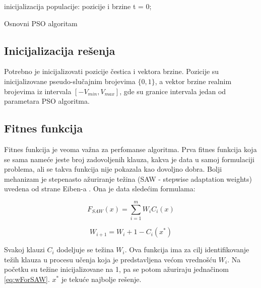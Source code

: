 \documentclass{article}
\begin{document}
\begin{algorithm}[H]
\SetAlgoLined
{}

\BlankLine
 inicijalizacija populacije: pozicije i brzine\;
 t = 0; \\
\caption{Osnovni PSO algoritam}
\end{algorithm}


\subsection{Inicijalizacija rešenja}
\label{sec:pso_init}
Potrebno je inicijalizovati pozicije čestica i vektora brzine. Pozicije su inicijalizovane pseudo-slučajnim brojevima $\{0,1\}$, a vektor brzine realnim brojevima iz intervala $[-V_{min}, V_{max}]$, gde su granice intervala jedan od parametara PSO algoritma.


\subsection{Fitnes funkcija}
\label{sec:pso_fitness}
Fitnes funkcija je veoma važna za perfomanse algoritma.
Prva fitnes funkcija koja se sama nameće jeste broj zadovoljenih klauza, kakva je data u samoj formulaciji problema, ali se takva funkcija nije pokazala kao dovoljno dobra. Bolji mehanizam je stepenasto ažuriranje težina (SAW - stepwise adaptation weights) uvedena od strane Eiben-a \cite{fitnes}. Ona je data sledećim formulama:

\begin{equation}\label{eq:SAW}
F_{SAW}(x) = \sum_{i=1}^{m} W_iC_i(x)
\end{equation}

\begin{equation}\label{eq:wForSAW}
W_{i+1} = W_{i} + 1 - C_i(x^*)
\end{equation}

Svakoj klauzi $C_i$ dodeljuje se težina $W_i$. Ova funkcija ima za cilj identifikovanje težih klauza u procesu učenja koja je predstavljena većom vrednošću $W_i$. Na početku su težine inicijalizovane na 1, pa se potom ažuriraju jednačinom \ref{eq:wForSAW}. $x^*$ je tekuće najbolje rešenje.
\end{document}
